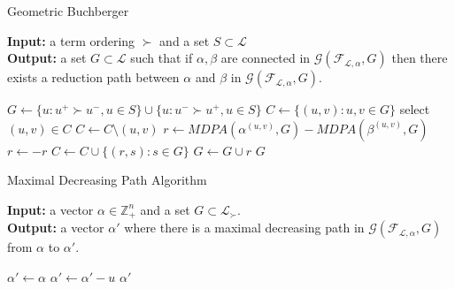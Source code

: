 \documentclass[9pt]{beamer}
\newcommand\F{\mathcal{F}}
\newcommand\G{\mathcal{G}}
\newcommand\set[1]{\{#1\}}
\newcommand\Z{\mathbb{Z}}
\theoremstyle{definition}
\begin{document}
\begin{frame}[fragile]{Geometric Buchberger}
  
  \begin{algorithm}[H]
    \textbf{Input:} a term ordering $\succ$ and a set $S \subset \mathcal{L}$\\
    \textbf{Output:} a set $G \subset \mathcal{L}$ such that if $\alpha, \beta$
    are connected in $\G(\F_{\mathcal{L}, \alpha}, G)$ then there exists a reduction
    path between $\alpha$ and $\beta$ in $\G(\F_{\mathcal{L}, \alpha}, G)$.
    \begin{algorithmic}[1]
      \STATE $G \leftarrow \set{u : u^+ \succ u^-, u \in S} \cup \set{u : u^- \succ u^+, u \in S}$ 
      \STATE $C \leftarrow \set{(u,v) : u, v \in G}$
      \STATE select $(u, v) \in C$
      \STATE $C \leftarrow C \setminus (u,v)$
      \STATE $r \leftarrow MDPA(\alpha^{(u,v)}, G) - MDPA(\beta^{(u,v)}, G)$
      \STATE $r \leftarrow -r$
      \ENDIF
      \STATE $C \leftarrow C \cup \set{(r, s) : s \in G}$
      \STATE $G \leftarrow G \cup r$
      \ENDIF
      \ENDWHILE
      \RETURN $G$
    \end{algorithmic}
  \end{algorithm}

\end{frame}

\begin{frame}[fragile]{Maximal Decreasing Path Algorithm}
  
  \begin{algorithm}[H]
    \textbf{Input:} a vector $\alpha \in \Z^n_+$ and a set $G \subset \mathcal{L}_{\succ}$. \\
    \textbf{Output:} a vector $\alpha'$ where there is a  maximal decreasing path in
    $\G(\F_{\mathcal{L}, \alpha}, G)$ from $\alpha$ to $\alpha'$.
    \begin{algorithmic}[1]
      \STATE $\alpha' \leftarrow \alpha$
      \STATE $\alpha' \leftarrow \alpha' - u$
      \ENDWHILE
      \RETURN $\alpha'$
    \end{algorithmic}
  \end{algorithm}

\end{frame}
\end{document}
